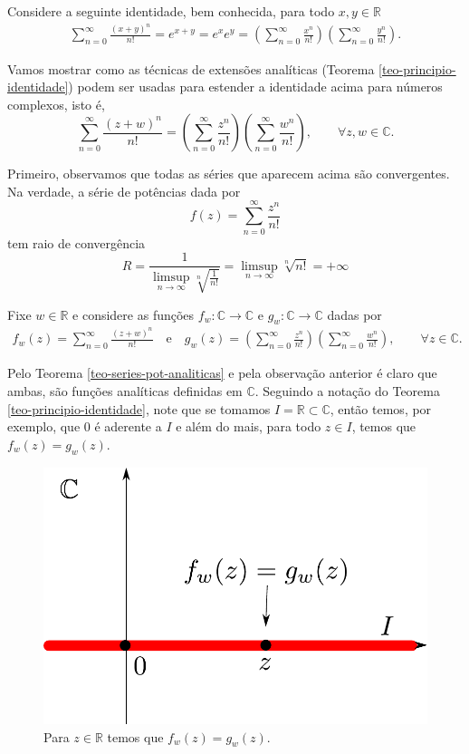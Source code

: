 \begin{exemplo}
Considere a seguinte identidade, bem conhecida, para todo $x,y\in\mathbb{R}$
\begin{align}\label{eq-aux1-form-prod-exp-ext-analitica}
\sum_{n=0}^{\infty} \frac{(x+y)^n }{n!}
=
e^{x+y}
=
e^xe^y
= 
\left( \sum_{n=0}^{\infty} \frac{x^n}{n!} \right)
\left( \sum_{n=0}^{\infty} \frac{y^n}{n!} \right).
\end{align}

Vamos mostrar como as técnicas de extensões analíticas 
(Teorema \ref{teo-principio-identidade})
podem ser usadas para estender a identidade acima para números complexos, isto é,
\[
\sum_{n=0}^{\infty} \frac{(z+w)^n }{n!}
= 
\left( \sum_{n=0}^{\infty} \frac{z^n}{n!} \right)
\left( \sum_{n=0}^{\infty} \frac{w^n}{n!} \right),
\qquad \forall z,w\in\mathbb{C}.
\]

Primeiro, observamos que todas as séries que aparecem acima são convergentes. 
Na verdade, a série de potências dada por
\[
f(z) = \sum_{n=0}^{\infty} \frac{z^n}{n!}
\]
tem raio de convergência
\[
R 
= 
\frac{1}{\displaystyle  \limsup_{n\to\infty} \sqrt[n]{ \frac{1}{n!} } }
=
\limsup_{n\to\infty} \sqrt[n]{ n! }
=+\infty
\]


Fixe $w\in \mathbb{R}$ e considere as funções 
$f_{w}:\mathbb{C}\to\mathbb{C}$ e $g_{w}:\mathbb{C}\to\mathbb{C}$ 
dadas por 
\begin{align*}
f_{w}(z) = \sum_{n=0}^{\infty} \frac{(z+w)^n }{n!}
\quad\text{e}\quad
g_{w}(z) = \left( \sum_{n=0}^{\infty} \frac{z^n}{n!} \right)
\left( \sum_{n=0}^{\infty} \frac{w^n}{n!} \right),
\qquad \forall z\in\mathbb{C}.
\end{align*}

Pelo Teorema \ref{teo-series-pot-analiticas} e pela observação anterior 
é claro que ambas, são funções analíticas
definidas em $\mathbb{C}$. 
Seguindo a notação do Teorema \ref{teo-principio-identidade},
note que se tomamos $I=\mathbb{R}\subset \mathbb{C}$, 
então temos, por exemplo, que $0$ é aderente a $I$ 
e além do mais, para todo $z\in I$, temos que
$f_{w}(z)=g_{w}(z)$. 


\begin{figure}[h]
\centering
\includegraphics[width=0.4\linewidth]{Figuras/zeros-isolados7}
\caption{Para $z\in\mathbb{R}$ temos que $f_{w}(z)=g_{w}(z)$.}
\label{fig:zeros-isolados7}
\end{figure}




\end{exemplo}
